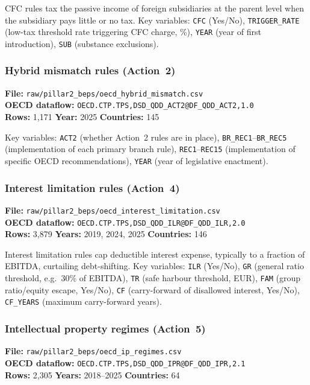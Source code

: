 \documentclass[11pt,a4paper]{article}
\newcommand{\code}[1]{\texttt{#1}}
\begin{document}
CFC rules tax the passive income of foreign subsidiaries at the parent level when the subsidiary pays little or no tax.  Key variables: \code{CFC} (Yes/No), \code{TRIGGER\_RATE} (low-tax threshold rate triggering CFC charge, \%), \code{YEAR} (year of first introduction), \code{SUB} (substance exclusions).

\subsubsection{Hybrid mismatch rules (Action~2)}

\textbf{File:} \texttt{raw/pillar2\_beps/oecd\_hybrid\_mismatch.csv}\\
\textbf{OECD dataflow:} \texttt{OECD.CTP.TPS,DSD\_QDD\_ACT2@DF\_QDD\_ACT2,1.0}\\
\textbf{Rows:} 1{,}171 \quad \textbf{Year:} 2025 \quad \textbf{Countries:} 145

Key variables: \code{ACT2} (whether Action~2 rules are in place), \code{BR\_REC1}--\code{BR\_REC5} (implementation of each primary branch rule), \code{REC1}--\code{REC15} (implementation of specific OECD recommendations), \code{YEAR} (year of legislative enactment).

\subsubsection{Interest limitation rules (Action~4)}

\textbf{File:} \texttt{raw/pillar2\_beps/oecd\_interest\_limitation.csv}\\
\textbf{OECD dataflow:} \texttt{OECD.CTP.TPS,DSD\_QDD\_ILR@DF\_QDD\_ILR,2.0}\\
\textbf{Rows:} 3{,}879 \quad \textbf{Years:} 2019, 2024, 2025 \quad \textbf{Countries:} 146

Interest limitation rules cap deductible interest expense, typically to a fraction of EBITDA, curtailing debt-shifting.  Key variables: \code{ILR} (Yes/No), \code{GR} (general ratio threshold, e.g.\ 30\% of EBITDA), \code{TR} (safe harbour threshold, EUR), \code{FAM} (group ratio/equity escape, Yes/No), \code{CF} (carry-forward of disallowed interest, Yes/No), \code{CF\_YEARS} (maximum carry-forward years).

\subsubsection{Intellectual property regimes (Action~5)}

\textbf{File:} \texttt{raw/pillar2\_beps/oecd\_ip\_regimes.csv}\\
\textbf{OECD dataflow:} \texttt{OECD.CTP.TPS,DSD\_QDD\_IPR@DF\_QDD\_IPR,2.1}\\
\textbf{Rows:} 2{,}305 \quad \textbf{Years:} 2018--2025 \quad \textbf{Countries:} 64
\end{document}
